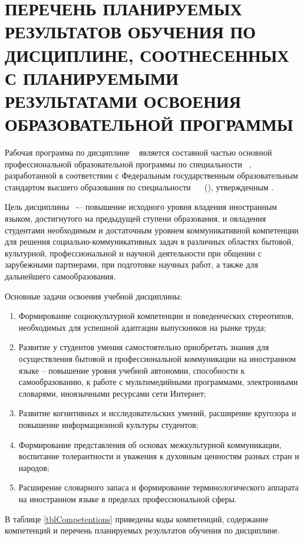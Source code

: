 \chapter{ПЕРЕЧЕНЬ ПЛАНИРУЕМЫХ РЕЗУЛЬТАТОВ ОБУЧЕНИЯ ПО ДИСЦИПЛИНЕ, СООТНЕСЕННЫХ С ПЛАНИРУЕМЫМИ РЕЗУЛЬТАТАМИ ОСВОЕНИЯ ОБРАЗОВАТЕЛЬНОЙ ПРОГРАММЫ} \label{chapt1}
Рабочая программа по дисциплине \DisciplineName~ является составной частью основной профессиональной образовательной программы по специальности \SpecialityCode~\SpecialityName, разработанной в соответствии с Федеральным государственным образовательным стандартом высшего образования по специальности \SpecialityCode~\SpecialityName~ (\QualificaionLevel), утвержденным \DocumentApprove.

Цель дисциплины \DisciplineName ~-– повышение исходного уровня владения иностранным языком, достигнутого на предыдущей ступени образования, и овладения студентами необходимым и достаточным уровнем коммуникативной компетенции для решения социально-коммуникативных задач в различных областях бытовой, культурной, профессиональной и научной деятельности при общении с зарубежными партнерами, при подготовке научных работ, а также для дальнейшего самообразования.

Основные задачи освоения учебной дисциплины:
\begin{enumerate}
\item Формирование социокультурной компетенции и поведенческих стереотипов, необходимых для успешной адаптации выпускников на рынке труда; 
\item Развитие у студентов умения самостоятельно приобретать знания для осуществления бытовой и профессиональной коммуникации на иностранном языке – повышение уровня учебной автономии, способности к самообразованию, к работе с мультимедийными программами, электронными словарями, иноязычными ресурсами сети Интернет; 
\item Развитие когнитивных и исследовательских умений, расширение кругозора и повышение информационной культуры студентов; 
\item Формирование представления об основах межкультурной коммуникации, воспитание толерантности и уважения к духовным ценностям разных стран и народов; 
\item Расширение словарного запаса и формирование терминологического аппарата на иностранном языке в пределах профессиональной сферы.
\end{enumerate}

В таблице \ref{tblCompetentions} приведены коды компетенций, содержание компетенций и перечень планируемых результатов обучения по дисциплине.

